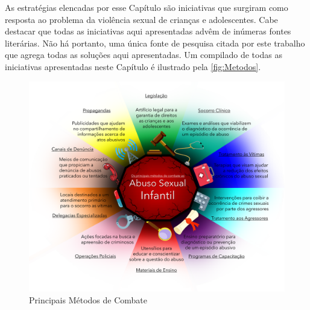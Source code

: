 As estratégias elencadas por esse Capítulo são iniciativas que surgiram como resposta ao problema da violência sexual de crianças e adolescentes. Cabe destacar que todas as iniciativas aqui apresentadas advêm de inúmeras fontes literárias. Não há portanto, uma única fonte de pesquisa citada por este trabalho que agrega todas as soluções aqui apresentadas. Um compilado de todas as iniciativas apresentadas neste Capítulo é ilustrado pela \autoref{fig:Metodos}.




\begin{figure}[htb]
  
	\caption{\label{fig:Metodos}Principais Métodos de Combate}\vspace{-0.2cm}
  \begin{adjustwidth}{-4.2cm}{-0.0cm}
    \includegraphics[scale=0.65]{./Figuras/MétodosCombate.pdf}
	\end{adjustwidth}\vspace{-1.5cm}

\end{figure}

\newpage




